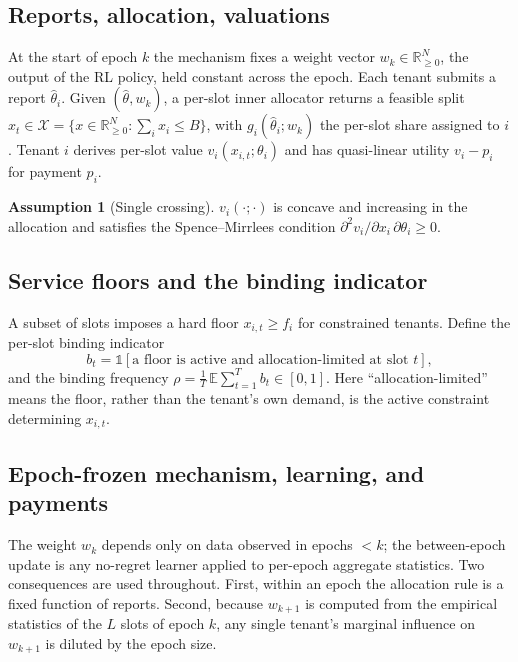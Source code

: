 \documentclass[conference]{IEEEtran}
\theoremstyle{definition}
\newtheorem{assumption}{Assumption}
\theoremstyle{remark}
\newcommand{\Slots}{T}
\newcommand{\Ep}{L}
\newcommand{\Ntn}{N}
\newcommand{\rhobind}{\rho}
\newcommand{\type}{\theta}
\newcommand{\alloc}{x}
\newcommand{\allocsp}{\mathcal{X}}
\newcommand{\wt}{w}
\newcommand{\val}{v}
\newcommand{\flo}{f}
\newcommand{\bindind}{b}
\newcommand{\E}{\mathbb{E}}
\newcommand{\R}{\mathbb{R}}
\newcommand{\ind}{\mathbb{1}}
\begin{document}
\subsection{Reports, allocation, valuations}
At the start of epoch $k$ the mechanism fixes a weight vector $\wt_k\in\R_{\ge0}^{\Ntn}$, the output of the RL policy, held constant across the epoch. Each tenant submits a report $\hat\type_i$. Given $(\hat\type,\wt_k)$, a per-slot inner allocator returns a feasible split $\alloc_t\in\allocsp=\{\alloc\in\R_{\ge0}^{\Ntn}:\sum_i\alloc_i\le B\}$, with $g_i(\hat\type_i;\wt_k)$ the per-slot share assigned to $i$. Tenant $i$ derives per-slot value $\val_i(\alloc_{i,t};\type_i)$ and has quasi-linear utility $\val_i-p_i$ for payment $p_i$.

\begin{assumption}[Single crossing]\label{ass:sc}
$\val_i(\cdot;\cdot)$ is concave and increasing in the allocation and satisfies the Spence--Mirrlees condition $\partial^2\val_i/\partial\alloc_i\,\partial\type_i\ge0$.
\end{assumption}

\subsection{Service floors and the binding indicator}
A subset of slots imposes a hard floor $\alloc_{i,t}\ge\flo_i$ for constrained tenants. Define the per-slot binding indicator
\begin{equation}
\bindind_t=\ind[\text{a floor is active and allocation-limited at slot }t],
\end{equation}
and the binding frequency $\rhobind=\tfrac{1}{\Slots}\,\E\sum_{t=1}^{\Slots}\bindind_t\in[0,1]$. Here ``allocation-limited'' means the floor, rather than the tenant's own demand, is the active constraint determining $\alloc_{i,t}$.

\subsection{Epoch-frozen mechanism, learning, and payments}
The weight $\wt_k$ depends only on data observed in epochs $<k$; the between-epoch update is any no-regret learner applied to per-epoch aggregate statistics. Two consequences are used throughout. First, within an epoch the allocation rule is a fixed function of reports. Second, because $\wt_{k+1}$ is computed from the empirical statistics of the $\Ep$ slots of epoch $k$, any single tenant's marginal influence on $\wt_{k+1}$ is diluted by the epoch size.
\end{document}
